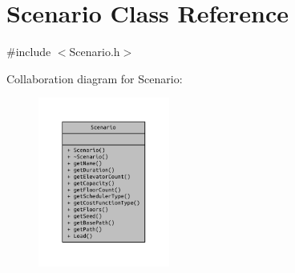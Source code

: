 \section{Scenario Class Reference}
\label{class_scenario}


{\ttfamily \#include $<$Scenario.\+h$>$}



Collaboration diagram for Scenario\+:\nopagebreak
\begin{figure}[H]
\begin{center}
\leavevmode
\includegraphics[width=122pt]{class_scenario__coll__graph}
\end{center}
\end{figure}
